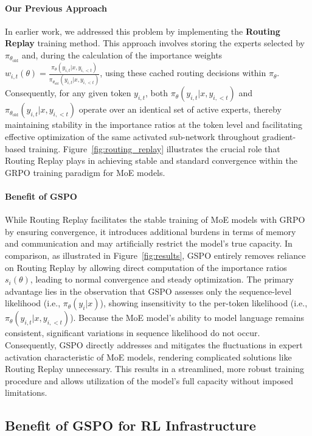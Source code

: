 \paragraph{Our Previous Approach} In earlier work, we addressed this problem by implementing the \textbf{Routing Replay} training method. This approach involves storing the experts selected by $\pi_{\theta_\text{old}}$ and, during the calculation of the importance weights $w_{i,t}(\theta) = \frac{ \pi_{\theta} (y_{i,t} | x, y_{i,<t}) }{ \pi_{\theta_\text{old}} (y_{i,t} | x,y_{i,<t})}$, using these cached routing decisions within $\pi_{\theta}$. Consequently, for any given token $y_{i,t}$, both $\pi_{\theta} (y_{i,t} | x, y_{i,<t})$ and $\pi_{\theta_\text{old}} (y_{i,t} | x,y_{i,<t})$ operate over an identical set of active experts, thereby maintaining stability in the importance ratios at the token level and facilitating effective optimization of the same activated sub-network throughout gradient-based training. Figure~\ref{fig:routing_replay} illustrates the crucial role that Routing Replay plays in achieving stable and standard convergence within the GRPO training paradigm for MoE models.

\paragraph{Benefit of GSPO} While Routing Replay facilitates the stable training of MoE models with GRPO by ensuring convergence, it introduces additional burdens in terms of memory and communication and may artificially restrict the model’s true capacity. In comparison, as illustrated in Figure~\ref{fig:results}, GSPO entirely removes reliance on Routing Replay by allowing direct computation of the importance ratios $s_i(\theta)$, leading to normal convergence and steady optimization. The primary advantage lies in the observation that GSPO assesses only the sequence-level likelihood (i.e., $\pi_{\theta} (y_i | x)$), showing insensitivity to the per-token likelihood (i.e., $\pi_{\theta} (y_{i,t} | x, y_{i,<t})$). Because the MoE model’s ability to model language remains consistent, significant variations in sequence likelihood do not occur. Consequently, GSPO directly addresses and mitigates the fluctuations in expert activation characteristic of MoE models, rendering complicated solutions like Routing Replay unnecessary. This results in a streamlined, more robust training procedure and allows utilization of the model’s full capacity without imposed limitations.

\subsection{Benefit of GSPO for RL Infrastructure}

